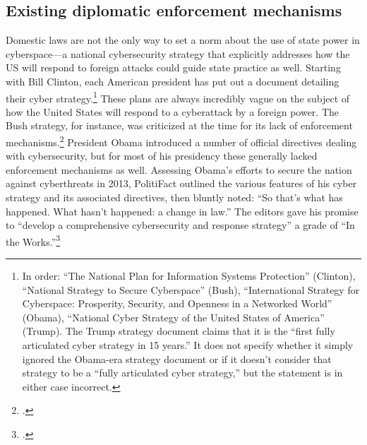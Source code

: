 \documentclass{memoir}
\begin{document}
\begin{refsegment}
\subsection{Existing diplomatic enforcement mechanisms}
Domestic laws are not the only way to set a norm about the use of state power in cyberspace---a national cybersecurity strategy that explicitly addresses how the US will respond to foreign attacks could guide state practice as well. Starting with Bill Clinton, each American president has put out a document detailing their cyber strategy.\footnote{In order: ``The National Plan for Information Systems Protection'' (Clinton), ``National Strategy to Secure Cyberspace'' (Bush), ``International Strategy for Cyberspace: Prosperity, Security, and Openness in a Networked World'' (Obama), ``National Cyber Strategy of the United States of America'' (Trump). The Trump strategy document claims that it is the ``first fully articulated cyber strategy in 15 years.'' It does not specify whether it simply ignored the Obama-era strategy document or if it doesn't consider that strategy to be a ``fully articulated cyber strategy,'' but the statement is in either case incorrect.} These plans are always incredibly vague on the subject of how the United States will respond to a cyberattack by a foreign power. The Bush strategy, for instance, was criticized at the time for its lack of enforcement mechanisms.\footcite{lemos_bush_2003} President Obama introduced a number of official directives dealing with cybersecurity, but for most of his presidency these generally lacked enforcement mechanisms as well. Assessing Obama's efforts to secure the nation against cyberthreats in 2013, PolitiFact outlined the various features of his cyber strategy and its associated directives, then bluntly noted: ``So that's what has happened. What hasn't happened: a change in law.'' The editors gave his promise to ``develop a comprehensive cybersecurity and response strategy'' a grade of ``In the Works.''\footcite{moorhead_work_2013}



\end{refsegment}
\end{document}
